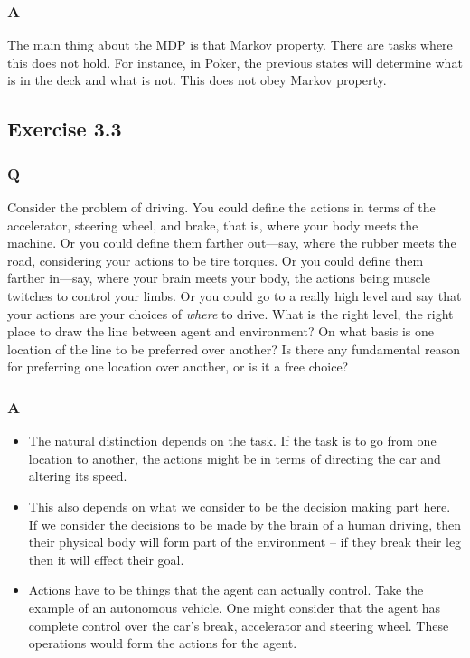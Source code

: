 \subsubsection{A}
The main thing about the MDP is that Markov property. There are tasks where this does not hold. For instance, in Poker, the previous states will determine what is in the deck and what is not. This does not obey Markov property.

\subsection{Exercise 3.3}
\subsubsection{Q}
Consider the problem of driving. You could define the actions in terms of the accelerator, steering wheel, and brake, that is, where your body meets the machine. Or you could define them farther out—say, where the rubber meets the road, considering your actions to be tire torques. Or you could define them farther in—say, where your brain meets your body, the actions being muscle twitches to control your limbs. Or you could go to a really high level and say that your actions are your choices of \emph{where} to drive. What is the right level, the right place to draw the line between agent and environment? On what basis is one location of the line to be preferred over another? Is there any fundamental reason for preferring one location over another, or is it a free choice?

\subsubsection{A}

\begin{itemize}
    \item The natural distinction depends on the task. If the task is to go from one location to another, the actions might be in terms of directing the car and altering its speed. 
    \item This also depends on what we consider to be the decision making part here. If we consider the decisions to be made by the brain of a human driving, then their physical body will form part of the environment -- if they break their leg then it will effect their goal.
    \item Actions have to be things that the agent can actually control. Take the example of an autonomous vehicle. One might consider that the agent has complete control over the car's break, accelerator and steering wheel. These operations would form the actions for the agent. 
\end{itemize}


